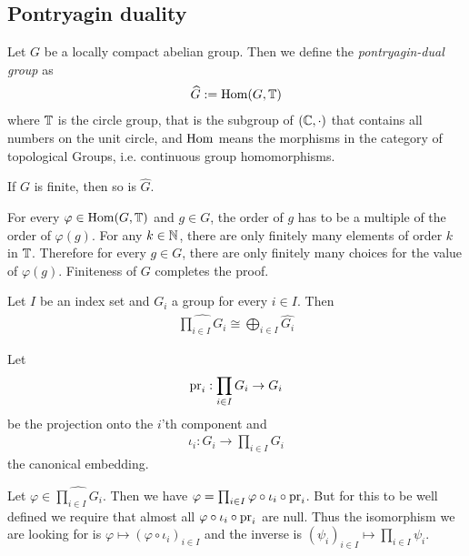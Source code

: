 \subsection{Pontryagin duality}

\begin{Definition}
	Let $G$ be a locally compact abelian group. Then we define the \emph{pontryagin-dual group} as
	\begin{align*}
		\widehat{G} := \operatorname{Hom}(G,\mathbb{T})
	\end{align*}
	where $\mathbb{T}$ is the circle group, that is the subgroup of $(\mathbb{C},\cdot)$ that contains all numbers on the unit circle, and $\operatorname{Hom}$ means the morphisms in the category of topological Groups, i.e. continuous group homomorphisms.
\end{Definition}

\begin{Lemma}
	If $G$ is finite, then so is $\widehat{G}$.
\end{Lemma}

\proof
	For every $\varphi \in \operatorname{Hom}(G,\mathbb{T})$ and $g \in G$, the order of $g$ has to be a multiple of the order of $\varphi(g)$.
	For any $k \in \mathbb{N}$, there are only finitely many elements of order $k$ in $\mathbb{T}$.
	Therefore for every $g \in G$, there are only finitely many choices for the value of $\varphi(g)$.
	Finiteness of $G$ completes the proof.
\endproof

\begin{Lemma}
	\label{the_zero_divisor_problem:pontryagin_duality:lemma_dual_product}
	Let $I$ be an index set and $G_i$ a group for every $i \in I$. Then
	\begin{align*}
		\widehat{\prod_{i \in I} G_i} \cong \bigoplus_{i \in I} \widehat{G_i}
	\end{align*}
\end{Lemma}

\proof
	Let
	\begin{align*}
		\operatorname{pr}_i: \prod_{i \in I} G_i \to G_i
	\end{align*}
	be the projection onto the $i$'th component and
	\begin{align*}
		\iota_i: G_i \to \prod_{i \in I} G_i
	\end{align*}
	the canonical embedding.

	Let $\varphi \in \widehat{\prod_{i \in I} G_i}$. Then we have
	$\varphi = \prod_{i \in I} \varphi \circ \iota_i \circ \operatorname{pr}_i$.
	But for this to be well defined we require that almost all $\varphi \circ \iota_i \circ \operatorname{pr}_i$ are null.
	Thus the isomorphism we are looking for is $\varphi \mapsto (\varphi \circ \iota_i)_{i \in I}$ and the inverse is $(\psi_i)_{i \in I} \mapsto \prod_{i \in I} \psi_i$.
\endproof

